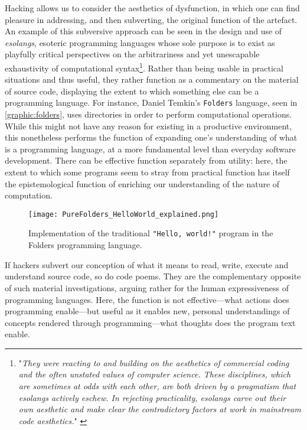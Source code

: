 Hacking allows us to consider the aesthetics of dysfunction, in which one can find pleasure in addressing, and then subverting, the original function of the artefact. An example of this subversive approach can be seen in the design and use of \emph{esolangs}, esoteric programming languages whose sole purpose is to exist as playfully critical perspectives on the arbitrariness and yet unescapable exhaustivity of computational syntax\footnote{"\emph{They were reacting to and building on the aesthetics of commercial coding and the often unstated values of computer science. These disciplines, which are sometimes at odds with each other, are both driven by a pragmatism that esolangs actively eschew. In rejecting practicality, esolangs carve out their own aesthetic and make clear the contradictory factors at work in mainstream code aesthetics.}" \citep{temkin_less_2023}}. Rather than being usable in practical situations and thus useful, they rather function as a commentary on the material of source code, displaying the extent to which something else can be a programming language. For instance, Daniel Temkin's \lstinline{Folders} language, seen in \autoref{graphic:folders}, uses directories in order to perform computational operations. While this might not have any reason for existing in a productive environment, this nonetheless performs the function of expanding one's understanding of what is a programming language, at a more fundamental level than everyday software development. There can be effective function separately from utility: here, the extent to which some programs seem to stray from practical function has itself the epistemological function of enriching our understanding of the nature of computation.

\begin{figure}
  \texttt{[image: PureFolders\_HelloWorld\_explained.png]}
  \caption{Implementation of the traditional \lstinline{"Hello, world!"} program in the Folders programming language. \citep{temkin_daniel_2015}}
  \label{graphic:folders}
\end{figure}

If hackers subvert our conception of what it means to read, write, execute and understand source code, so do code poems. They are the complementary opposite of such material investigations, arguing rather for the human expressiveness of programming languages. Here, the function is not effective—what actions does programming enable—but useful as it enables new, personal understandings of concepts rendered through programming—what thoughts does the program text enable.

